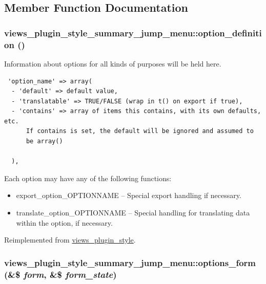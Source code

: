 \subsection{Member Function Documentation}
\hypertarget{classviews__plugin__style__summary__jump__menu_f8b62f282687c9670850c990c376f2c4}{
\subsubsection[{option\_\-definition}]{\setlength{\rightskip}{0pt plus 5cm}views\_\-plugin\_\-style\_\-summary\_\-jump\_\-menu::option\_\-definition ()}}
\label{classviews__plugin__style__summary__jump__menu_f8b62f282687c9670850c990c376f2c4}


Information about options for all kinds of purposes will be held here. 

\begin{Code}\begin{verbatim} 'option_name' => array(
  - 'default' => default value,
  - 'translatable' => TRUE/FALSE (wrap in t() on export if true),
  - 'contains' => array of items this contains, with its own defaults, etc.
      If contains is set, the default will be ignored and assumed to
      be array()

  ),
\end{verbatim}
\end{Code}

 Each option may have any of the following functions:\begin{itemize}
\item export\_\-option\_\-OPTIONNAME -- Special export handling if necessary.\item translate\_\-option\_\-OPTIONNAME -- Special handling for translating data within the option, if necessary. \end{itemize}


Reimplemented from \hyperlink{classviews__plugin__style_95b6f2eadf403ff36f1ff2860294b3c2}{views\_\-plugin\_\-style}.\hypertarget{classviews__plugin__style__summary__jump__menu_b66730cfcd70ef23a0dbc05e80ad3d32}{
\subsubsection[{options\_\-form}]{\setlength{\rightskip}{0pt plus 5cm}views\_\-plugin\_\-style\_\-summary\_\-jump\_\-menu::options\_\-form (\&\$ {\em form}, \/  \&\$ {\em form\_\-state})}}
\label{classviews__plugin__style__summary__jump__menu_b66730cfcd70ef23a0dbc05e80ad3d32}


